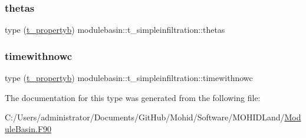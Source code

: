 \mbox{\label{structmodulebasin_1_1t__simpleinfiltration_a250b1e4965f986ee9aaed83fbd8788cb}} 
\subsubsection{\texorpdfstring{thetas}{thetas}}
{\footnotesize\ttfamily type (\mbox{\hyperlink{structmodulebasin_1_1t__propertyb}{t\+\_\+propertyb}}) modulebasin\+::t\+\_\+simpleinfiltration\+::thetas\hspace{0.3cm}{\ttfamily [private]}}

\mbox{\label{structmodulebasin_1_1t__simpleinfiltration_ad85cc3fd9bcb94f8fab6248187b710ee}} 
\subsubsection{\texorpdfstring{timewithnowc}{timewithnowc}}
{\footnotesize\ttfamily type (\mbox{\hyperlink{structmodulebasin_1_1t__propertyb}{t\+\_\+propertyb}}) modulebasin\+::t\+\_\+simpleinfiltration\+::timewithnowc\hspace{0.3cm}{\ttfamily [private]}}



The documentation for this type was generated from the following file\+:\begin{DoxyCompactItemize}
\item 
C\+:/\+Users/administrator/\+Documents/\+Git\+Hub/\+Mohid/\+Software/\+M\+O\+H\+I\+D\+Land/\mbox{\hyperlink{_module_basin_8_f90}{Module\+Basin.\+F90}}\end{DoxyCompactItemize}
